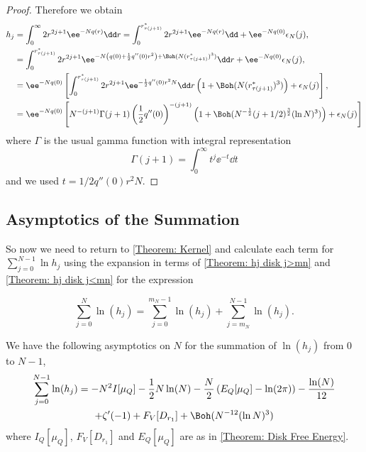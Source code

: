 \begin{proof}
Therefore we obtain
\begin{align}
	h_j & = \int_{0}^{\infty} 2r^{2j+1} \ee^{-N q(r)} \dd r = \int_{0}^{r^*_{\tau(j+1)}} 2r^{2j+1} \ee^{-N q(r)} \dd + \ee^{-N q(0)} \epsilon_N(j), \\
	& = \int_{0}^{r^*_{\tau(j+1)}} 2r^{2j+1} \ee^{-N \left( q(0) + \frac{1}{2} q''(0) r^2 \right) + \Boh(N(r^*_{\tau(j+1)})^3)} \dd  r + \ee^{-N q(0)} \epsilon_N(j), \\
	& =  \ee^{-N q(0)} \left[ \int_{0}^{r^*_{\tau(j+1)}} 2r^{2j+1} \ee^{-\frac{1}{2} q''(0) r^2 N} \dd r \left( 1 + \Boh(N(r^*_{\tau(j+1)})^3) \right)+ \epsilon_N(j) \right], \\
	&=  \ee^{-N q(0)} \left[ N^{-(j+1)} \Gamma(j+1)\left(\frac{1}{2} q''(0)\right)^{-(j+1)} \left( 1 + \Boh(N^{-\frac{1}{2}} (j+1/2)^{\frac{3}{2}} (\ln N)^3) \right)+ \epsilon_N(j) \right]
\end{align}
where $\Gamma$ is the usual gamma function with integral representation
\begin{equation}
	\Gamma(j+1) = \int_{0}^{\infty} t^j \ee^{-t} \dd t
\end{equation}
and we used $t = 1/2 q''(0) r^2 N$.
  
\end{proof}

\subsection{Asymptotics of the Summation}

So now we need to return to  \autoref{Theorem: Kernel} and calculate each term for $	\sum_{j=0}^{N-1} \ln{h_j}$ using the expansion in terms of \autoref{Theorem: hj disk j>mn} and \autoref{Theorem: hj disk j<mn} for the expression

\begin{equation}
	\sum_{j=0}^{N} \ln(h_j) = \sum_{j=0}^{m_N - 1} \ln(h_j)  + \sum_{j=m_N}^{N - 1} \ln(h_j).
\end{equation}

\begin{teorema}	\label{Theorem: Disk sum}
	We have the following asymptotics on $N$ for the summation of $\ln(h_j)$ from $0$ to $N - 1$,
	\begin{multline}
		\sum_{j=0}^{N-1} \ln (h_j) = -N^2 I[\mu_Q] - \frac{1}{2} N \ln(N)  -\frac{N}{2} \left( E_Q[\mu_Q] - \ln(2\pi) \right) - \frac{\ln(N)}{12} \\ + \zeta'(-1) + F_V[D_{r_1}] + \Boh(N^{-12} (\ln N)^3)
	\end{multline}
	where $I_Q[\mu_Q] $, $F_V[D_{r_1}]$ and $E_Q[\mu_Q]$ are as in \autoref{Theorem: Disk Free Energy}.
\end{teorema}

